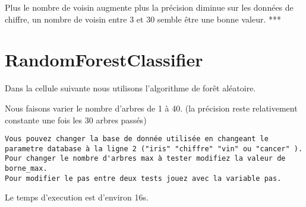 \documentclass[11pt]{article}
\begin{document}
    Plus le nombre de voisin augmente plus la précision diminue sur les
données de chiffre, un nombre de voisin entre 3 et 30 semble être une
bonne valeur. ***

    \section{RandomForestClassifier}\label{randomforestclassifier}

Dans la cellule suivante nous utilisons l'algorithme de forêt aléatoire.

Nous faisons varier le nombre d'arbres de 1 à 40. (la précision reste
relativement constante une fois les 30 arbres passés)

\begin{verbatim}
Vous pouvez changer la base de donnée utilisée en changeant le parametre database à la ligne 2 ("iris" "chiffre" "vin" ou "cancer" ).
Pour changer le nombre d'arbres max à tester modifiez la valeur de borne_max.
Pour modifier le pas entre deux tests jouez avec la variable pas.
\end{verbatim}

Le temps d'execution est d'environ 16s.
\end{document}
